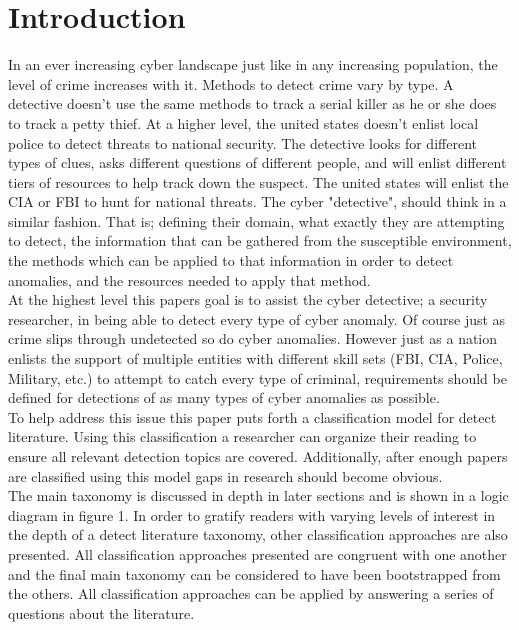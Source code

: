 \documentclass[10pt]{IEEEtran}
\begin{document}
\section{Introduction}
In an ever increasing cyber landscape just like in any increasing population, the level of crime increases with it. Methods to detect crime vary by type. A detective doesn't use the same methods to track a serial killer as he or she does to track a petty thief. At a higher level, the united states doesn't enlist local police to detect threats to national security. The detective looks for different types of clues, asks different questions of different people, and will enlist different tiers of resources to help track down the suspect. The united states will enlist the CIA or FBI to hunt for national threats. The cyber "detective", should think in a similar fashion. That is; defining their domain, what exactly they are attempting to detect, the information that can be gathered from the susceptible environment, the methods which can be applied to that information in order to detect anomalies, and the resources needed to apply that method. \\
At the highest level this papers goal is to assist the cyber detective; a security researcher, in being able to detect every type of cyber anomaly. Of course just as crime slips through undetected so do cyber anomalies. However just as a nation enlists the support of multiple entities with different skill sets (FBI, CIA, Police, Military, etc.) to attempt to catch every type of criminal, requirements should be defined for detections of as many types of cyber anomalies as possible. \\
To help address this issue this paper puts forth a classification model for detect literature. Using this classification a researcher can organize their reading to ensure all relevant detection topics are covered. Additionally, after enough papers are classified using this model gaps in research should become obvious.\\
The main taxonomy is discussed in depth in later sections and is shown in a logic diagram in figure 1. In order to gratify readers with varying levels of interest in the depth of a detect literature taxonomy, other classification approaches are also presented. All classification approaches presented are congruent with one another and the final main taxonomy can be considered to have been bootstrapped from the others. All classification approaches can be applied by answering a series of questions about the literature.
\end{document}
